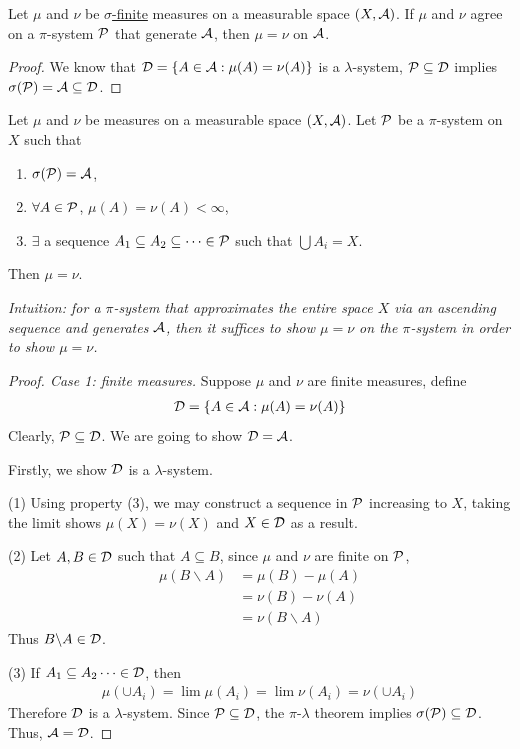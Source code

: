 \documentclass[11pt]{article}
\begin{document}
	\begin{corollary}
		Let $\mu$ and $\nu$ be \ul{$\sigma$-finite} measures on a measurable space $(X, \mathcal{{A}})$. If $\mu$ and $\nu$ agree on a $\pi$-system $\mathcal{{P}}$ that generate $\mathcal{{A}}$, then $\mu = \nu$ on $\mathcal{{A}}$.
		\begin{proof}
			We know that $\mathcal{{D}} = \{A \in \mathcal{{A}} : \mu(A) = \nu(A)\}$ is a $\lambda$-system, $\mathcal{{P}} \subseteq \mathcal{{D}}$ implies $\sigma(\mathcal{{P}}) = \mathcal{{A}} \subseteq \mathcal{{D}}$.
		\end{proof}
	\end{corollary}
	
	\begin{corollary}
		Let $\mu$ and $\nu$ be measures on a measurable space $(X, \mathcal{{A}})$. Let $\mathcal{{P}}$ be a $\pi$-system on $X$ such that
		\begin{enumerate}
			\item $\sigma(\mathcal{{P}}) = \mathcal{{A}}$,
			\item $\forall A \in \mathcal{{P}}$, $\mu(A) = \nu(A) < \infty$,
			\item $\exists$ a sequence $A_1 \subseteq A_2 \subseteq \dots \in \mathcal{{P}}$ such that $\bigcup A_i = X$.
		\end{enumerate}
		Then $\mu = \nu$.
		
		\emph{Intuition: for a $\pi$-system that approximates the entire space $X$ via an ascending sequence and generates $\mathcal{{A}}$, then it suffices to show $\mu = \nu$ on the $\pi$-system in order to show $\mu = \nu$.}
	\end{corollary}
	\begin{proof}[Proof. Case 1: finite measures]
		Suppose $\mu$ and $\nu$ are finite measures, define
		\begin{align}
			\mathcal{{D}} = \{A \in \mathcal{{A}}: \mu(A) = \nu(A)\}
		\end{align}
		Clearly, $\mathcal{{P}} \subseteq \mathcal{{D}}$.
		We are going to show $\mathcal{{D}} = \mathcal{{A}}$.
		
		Firstly, we show $\mathcal{{D}}$ is a $\lambda$-system.
		
		(1) Using property (3), we may construct a sequence in $\mathcal{{P}}$ increasing to $X$, taking the limit shows $\mu(X) = \nu(X)$ and $X \in \mathcal{{D}}$ as a result.
		
		(2) Let $A, B \in \mathcal{{D}}$ such that $A \subseteq B$, since $\mu$ and $\nu$ are finite on $\mathcal{{P}}$,
		\begin{align}
			\mu(B \backslash A) &= \mu(B) - \mu(A) \\
			&= \nu(B) - \nu(A) \\
			&= \nu(B \backslash A)
		\end{align}
		Thus $B \backslash A \in \mathcal{{D}}$.
		
		(3) If $A_1 \subseteq A_2 \dots \in \mathcal{{D}}$, then
		\begin{align}
			\mu(\cup A_i) = \lim \mu(A_i) = \lim \nu(A_i) = \nu(\cup A_i)
		\end{align}
		Therefore $\mathcal{{D}}$ is a $\lambda$-system.
		Since $\mathcal{{P}} \subseteq \mathcal{{D}}$, the $\pi$-$\lambda$ theorem implies $\sigma(\mathcal{{P}}) \subseteq \mathcal{{D}}$. Thus, $\mathcal{{A}} = \mathcal{{D}}$.
	\end{proof}
\end{document}
